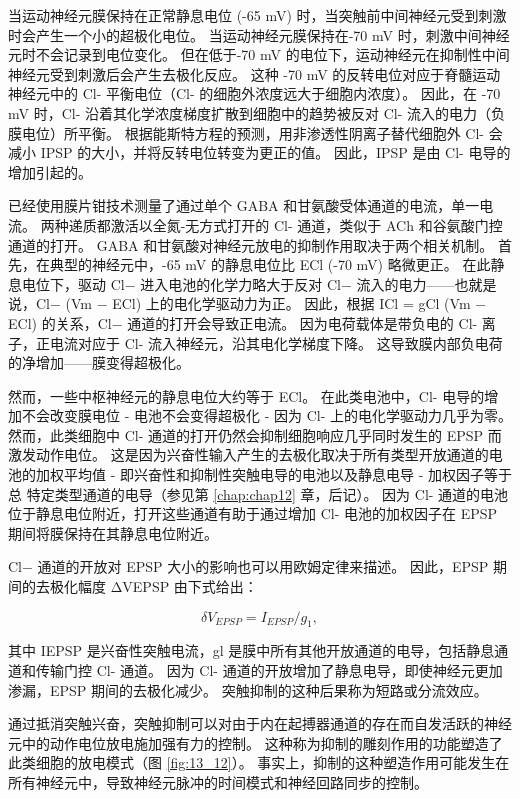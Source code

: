当运动神经元膜保持在正常静息电位 (-65 mV) 时，当突触前中间神经元受到刺激时会产生一个小的超极化电位。 
当运动神经元膜保持在-70 mV 时，刺激中间神经元时不会记录到电位变化。 
但在低于-70 mV 的电位下，运动神经元在抑制性中间神经元受到刺激后会产生去极化反应。
这种 -70 mV 的反转电位对应于脊髓运动神经元中的 Cl- 平衡电位（Cl- 的细胞外浓度远大于细胞内浓度）。
因此，在 -70 mV 时，Cl- 沿着其化学浓度梯度扩散到细胞中的趋势被反对 Cl- 流入的电力（负膜电位）所平衡。
根据能斯特方程的预测，用非渗透性阴离子替代细胞外 Cl- 会减小 IPSP 的大小，并将反转电位转变为更正的值。
因此，IPSP 是由 Cl- 电导的增加引起的。


已经使用膜片钳技术测量了通过单个 GABA 和甘氨酸受体通道的电流，单一电流。 
两种递质都激活以全氮-无方式打开的 Cl- 通道，类似于 ACh 和谷氨酸门控通道的打开。 
GABA 和甘氨酸对神经元放电的抑制作用取决于两个相关机制。
首先，在典型的神经元中，-65 mV 的静息电位比 ECl (-70 mV) 略微更正。
在此静息电位下，驱动 Cl− 进入电池的化学力略大于反对 Cl− 流入的电力——也就是说，Cl− (Vm − ECl) 上的电化学驱动力为正。
因此，根据 ICl = gCl (Vm − ECl) 的关系，Cl− 通道的打开会导致正电流。 因为电荷载体是带负电的 Cl- 离子，正电流对应于 Cl- 流入神经元，沿其电化学梯度下降。
这导致膜内部负电荷的净增加——膜变得超极化。


然而，一些中枢神经元的静息电位大约等于 ECl。 在此类电池中，Cl- 电导的增加不会改变膜电位 - 电池不会变得超极化 - 因为 Cl- 上的电化学驱动力几乎为零。 
然而，此类细胞中 Cl- 通道的打开仍然会抑制细胞响应几乎同时发生的 EPSP 而激发动作电位。 这是因为兴奋性输入产生的去极化取决于所有类型开放通道的电池的加权平均值 - 即兴奋性和抑制性突触电导的电池以及静息电导 - 加权因子等于总 特定类型通道的电导（参见第 \ref{chap:chap12} 章，后记）。
因为 Cl- 通道的电池位于静息电位附近，打开这些通道有助于通过增加 Cl- 电池的加权因子在 EPSP 期间将膜保持在其静息电位附近。


Cl− 通道的开放对 EPSP 大小的影响也可以用欧姆定律来描述。
因此，EPSP 期间的去极化幅度 ΔVEPSP 由下式给出：

\begin{equation}\label{depolarization_amplitude}
	\delta V_{EPSP} = I_{EPSP} / g_1,
\end{equation}

其中 IEPSP 是兴奋性突触电流，gl 是膜中所有其他开放通道的电导，包括静息通道和传输门控 Cl- 通道。 因为 Cl- 通道的开放增加了静息电导，即使神经元更加渗漏，EPSP 期间的去极化减少。 
突触抑制的这种后果称为短路或分流效应。


通过抵消突触兴奋，突触抑制可以对由于内在起搏器通道的存在而自发活跃的神经元中的动作电位放电施加强有力的控制。 
这种称为抑制的雕刻作用的功能塑造了此类细胞的放电模式（图 \ref{fig:13_12}）。 
事实上，抑制的这种塑造作用可能发生在所有神经元中，导致神经元脉冲的时间模式和神经回路同步的控制。

